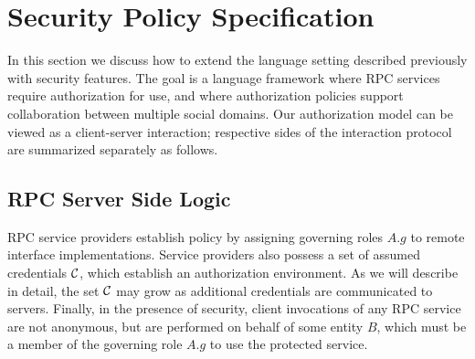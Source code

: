 %

\section{Security Policy Specification}
\label{section-security-extensions}

In this section we discuss how to extend the language setting described previously with security
features. The goal is a language framework where RPC services require authorization for use, and
where authorization policies support collaboration between multiple social domains. Our
authorization model can be viewed as a client-server interaction; respective sides of the
interaction protocol are summarized separately as follows.

\subsection{RPC Server Side Logic}
\label{section-rpc-server-side}

RPC service providers establish policy by assigning governing roles $A.g$ to remote interface
implementations. Service providers also possess a set of assumed credentials $\mathcal{C}$, which
establish an authorization environment. As we will describe in detail, the set $\mathcal{C}$ may grow
as additional credentials are communicated to servers. Finally, in the presence of security,
client invocations of any RPC service are not anonymous, but are performed on behalf of some
entity $B$, which must be a member of the governing role $A.g$ to use the protected service.

